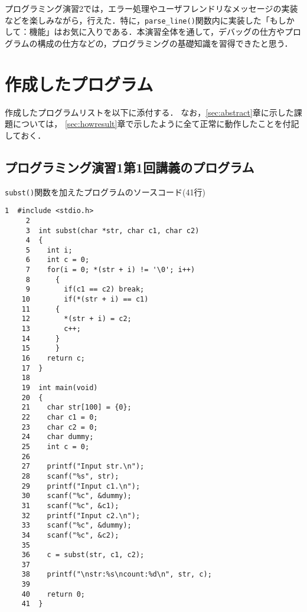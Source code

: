 プログラミング演習2では，エラー処理やユーザフレンドリなメッセージの実装などを楽しみながら，行えた．特に，\verb|parse_line()|関数内に実装した「もしかして：機能」はお気に入りである．本演習全体を通して，デバッグの仕方やプログラムの構成の仕方などの，プログラミングの基礎知識を習得できたと思う．

\section{作成したプログラム}\label{sec:makep}

作成したプログラムリストを以下に添付する．
なお，\ref{sec:abstract}章に示した課題については，
\ref{sec:howresult}章で示したように全て正常に動作したことを付記しておく．


\subsection{プログラミング演習1第1回講義のプログラム}\label{func1}
\verb|subst()|関数を加えたプログラムのソースコード(41行)
\begin{Verbatim}[fontsize=\small, baselinestretch=0.8]
     1	#include <stdio.h>
     2	
     3	int subst(char *str, char c1, char c2)
     4	{
     5	  int i;
     6	  int c = 0;
     7	  for(i = 0; *(str + i) != '\0'; i++)
     8	    {
     9	      if(c1 == c2) break;
    10	      if(*(str + i) == c1)
    11		{
    12		  *(str + i) = c2;
    13		  c++;
    14		}
    15	    }
    16	  return c;
    17	}
    18	
    19	int main(void)
    20	{
    21	  char str[100] = {0};
    22	  char c1 = 0;
    23	  char c2 = 0;
    24	  char dummy;
    25	  int c = 0; 
    26	
    27	  printf("Input str.\n");
    28	  scanf("%s", str);
    29	  printf("Input c1.\n");
    30	  scanf("%c", &dummy);
    31	  scanf("%c", &c1);
    32	  printf("Input c2.\n");
    33	  scanf("%c", &dummy);
    34	  scanf("%c", &c2);
    35	
    36	  c = subst(str, c1, c2);
    37	  
    38	  printf("\nstr:%s\ncount:%d\n", str, c);
    39	
    40	  return 0;
    41	}
\end{Verbatim}

